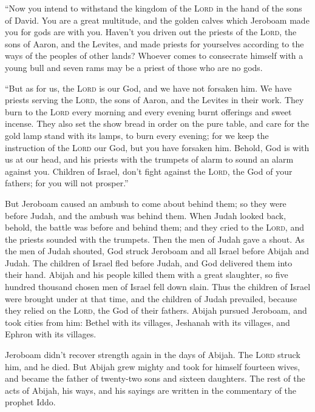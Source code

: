  ``Now you intend to withstand the kingdom of the
\textsc{Lord} in the hand of the sons of David. You are a great
multitude, and the golden calves which Jeroboam made you for gods are
with you.  Haven't you driven out the priests of the
\textsc{Lord}, the sons of Aaron, and the Levites, and made priests for
yourselves according to the ways of the peoples of other lands? Whoever
comes to consecrate himself with a young bull and seven rams may be a
priest of those who are no gods.

 ``But as for us, the \textsc{Lord} is our God, and we
have not forsaken him. We have priests serving the \textsc{Lord}, the
sons of Aaron, and the Levites in their work.  They burn
to the \textsc{Lord} every morning and every evening burnt offerings and
sweet incense. They also set the show bread in order on the pure table,
and care for the gold lamp stand with its lamps, to burn every evening;
for we keep the instruction of the \textsc{Lord} our God, but you have
forsaken him.  Behold, God is with us at our head, and
his priests with the trumpets of alarm to sound an alarm against you.
Children of Israel, don't fight against the \textsc{Lord}, the God of
your fathers; for you will not prosper.''

 But Jeroboam caused an ambush to come about behind them;
so they were before Judah, and the ambush was behind them.
 When Judah looked back, behold, the battle was before
and behind them; and they cried to the \textsc{Lord}, and the priests
sounded with the trumpets.  Then the men of Judah gave a
shout. As the men of Judah shouted, God struck Jeroboam and all Israel
before Abijah and Judah.  The children of Israel fled
before Judah, and God delivered them into their hand. 
Abijah and his people killed them with a great slaughter, so five
hundred thousand chosen men of Israel fell down slain. 
Thus the children of Israel were brought under at that time, and the
children of Judah prevailed, because they relied on the \textsc{Lord},
the God of their fathers.  Abijah pursued Jeroboam, and
took cities from him: Bethel with its villages, Jeshanah with its
villages, and Ephron with its villages.

 Jeroboam didn't recover strength again in the days of
Abijah. The \textsc{Lord} struck him, and he died.  But
Abijah grew mighty and took for himself fourteen wives, and became the
father of twenty-two sons and sixteen daughters.  The
rest of the acts of Abijah, his ways, and his sayings are written in the
commentary of the prophet Iddo.

